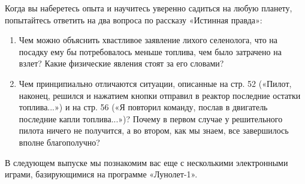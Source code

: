 \documentclass[11pt,a4paper,oneside]{article}
\begin{document}
Когда вы наберетесь опыта и научитесь уверенно садиться на любую планету, попытайтесь ответить на два вопроса по рассказу «Истинная правда»:
\begin{enumerate}
\item Чем можно объяснить хвастливое заявление лихого селенолога, что на посадку ему бы потребовалось меньше топлива, чем было затрачено на взлет? Какие физические явления стоят за его словами?
\item Чем принципиально отличаются ситуации, описанные на стр. 52 («Пилот, наконец, решился и нажатием кнопки отправил в реактор последние остатки топлива...») и на стр. 56 («Я повторил команду, послав в двигатель последние капли топлива...»)? Почему в первом случае у решительного пилота ничего не получится, а во втором, как мы знаем, все завершилось вполне благополучно?
\end{enumerate}

В следующем выпуске мы познакомим вас еще с несколькими электронными играми, базирующимися на программе «Лунолет-1».
\end{document}
